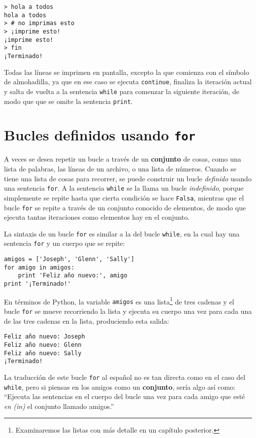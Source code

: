 \beforeverb
\begin{verbatim}
> hola a todos
hola a todos
> # no imprimas esto
> ¡imprime esto!
¡imprime esto!
> fin
¡Terminado!
\end{verbatim}
\afterverb
%
Todas las líneas se imprimen en pantalla, excepto la que comienza con el símbolo
de almohadilla, ya que en ese caso se ejecuta {\tt continue}, finaliza
la iteración actual y salta de vuelta
a la sentencia {\tt while} para comenzar la siguiente iteración, de modo que
que se omite la sentencia {\tt print}.

\section{Bucles definidos usando {\tt for} }

A veces se desea repetir un bucle a través de un {\bf conjunto} de cosas, como
una lista de palabras, las líneas de un archivo, o una lista de números.
Cuando se tiene una lista de cosas para recorrer, se puede
construir un bucle \emph{definido} usando una sentencia {\tt for}.
A la sentencia {\tt while} se la llama un bucle \emph{indefinido},
porque simplemente se repite hasta que cierta condición se hace {\tt Falsa},
mientras que el bucle {\tt for} se repite a través de un
conjunto conocido de elementos, de modo que ejecuta tantas iteraciones como
elementos hay en el conjunto.

La sintaxis de un bucle {\tt for} es similar a la del bucle {\tt while},
en la cual hay una sentencia {\tt for} y un cuerpo que se repite:

\beforeverb
\begin{verbatim}
amigos = ['Joseph', 'Glenn', 'Sally']
for amigo in amigos:
    print 'Feliz año nuevo:', amigo
print '¡Terminado!'
\end{verbatim}
\afterverb
%
En términos de Python,
la variable {\tt amigos} es una lista\footnote{Examinaremos
las listas con más detalle en un capítulo posterior.}
de tres cadenas y el bucle {\tt for}
se mueve recorriendo la lista y ejecuta su cuerpo una vez
para cada una de las tres cadenas en la lista, produciendo
esta salida:

\beforeverb
\begin{verbatim}
Feliz año nuevo: Joseph
Feliz año nuevo: Glenn
Feliz año nuevo: Sally
¡Terminado!
\end{verbatim}
\afterverb
%

La traducción de este bucle {\tt for} al español no es tan directa como
en el caso del {\tt while}, pero si piensas en los amigos como un {\bf conjunto},
sería algo así como: ``Ejecuta las sentencias en el cuerpo del bucle
una vez para cada amigo que esté \emph{en (in)} el conjunto llamado amigos.''

